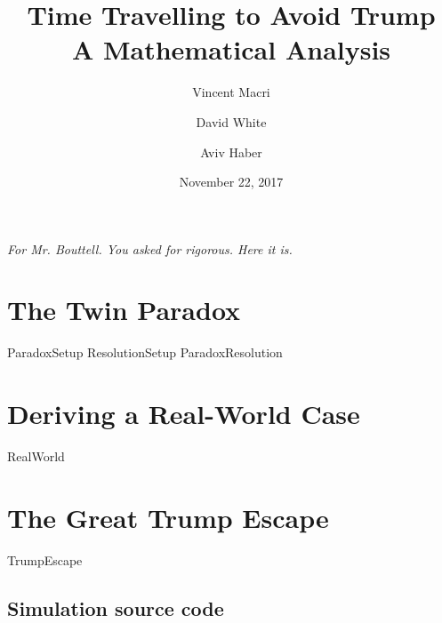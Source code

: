 \documentclass[letterpaper,12pt]{report}
\title{\Huge Time Travelling to Avoid Trump\\\LARGE A Mathematical Analysis}
\author{Vincent Macri \and David White \and Aviv Haber}
\date{November 22, 2017}
\begin{document}
	\maketitle
	\vspace*{\fill}
		\begin{center}
			\large
			\textit{For Mr. Bouttell. You asked for rigorous. Here it is.}
		\end{center}
	\vspace*{\fill}
	\clearpage
	
	\tableofcontents
	\clearpage
	\part{The Twin Paradox}\label{part:twinParadox}
		{ParadoxSetup}
		{ResolutionSetup}
		{ParadoxResolution}
	\part{Deriving a Real-World Case}\label{part:realWorld}
		{RealWorld}
	\part{The Great Trump Escape}\label{part:trumpEscape}
		{TrumpEscape}
	\appendix
	\chapter{Simulation source code}\label{appendix:sourceCode}
		
	\nocite{*}
	\printbibliography
\end{document}
